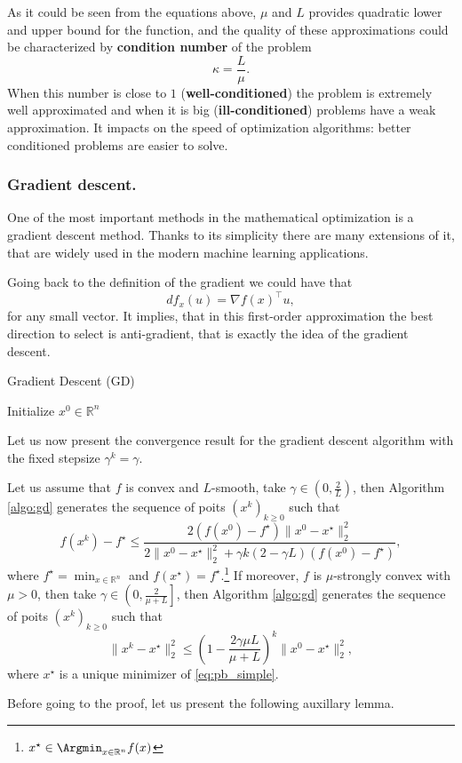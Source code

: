 As it could be seen from the equations above, $\mu$ and $L$ provides quadratic lower and upper bound for the function, and the quality of these approximations could be characterized by {\textbf{condition number}} of the problem
$$
\kappa =  \frac{L}{\mu}.
$$
When this number is close to $1$ ({\textbf{well-conditioned}}) the problem is extremely well approximated and when it is big ({\textbf{ill-conditioned}}) problems have a weak approximation. It impacts on the speed of optimization algorithms: better conditioned problems are easier to solve.





\subsubsection{Gradient descent.} One of the most important methods in the mathematical optimization is a gradient descent method. Thanks to its simplicity there are many extensions of it, that are widely used in the modern machine learning applications. 

Going back to the definition of the gradient we could have that
$$
df_x(u) = \nabla f(x)^\top u,
$$
for any small vector. It implies, that in this first-order approximation the best direction to select is anti-gradient, that is exactly the idea of the gradient descent.

\begin{algorithm}
    \caption{Gradient Descent (GD)}
    \label{algo:gd}
    \begin{algorithmic}
        \STATE Initialize $x^0\in\mathbb{R}^n$
        \ENDFOR
    \end{algorithmic}
\end{algorithm}

Let us now present the convergence result for the gradient descent algorithm with the fixed stepsize $\gamma^k = \gamma$.
\begin{theorem}\label{th:gd}
Let us assume that $f$ is convex and $L$-smooth, take $\gamma\in\left(0,\frac{2}{L}\right)$, then Algorithm \ref{algo:gd} generates the sequence of poits $(x^k)_{k\geq0}$ such that 
\begin{equation}
    f(x^k) - f^\star \leq \frac{2(f(x^0)-f^\star)\|x^0-x^\star\|_2^2}{2\|x^0-x^\star\|_2^2 + \gamma k(2-\gamma L)(f(x^0) - f^\star)},
\end{equation}
where $f^\star = \min_{x\in\mathbb{R}^n}$ and $f(x^\star) = f^\star$.\footnote{$x^\star\in\Argmin_{x\in\mathbb{R}^n}f(x)$}
If moreover, $f$ is $\mu$-strongly convex with $\mu>0$, then take $\gamma\in\left(0, \frac{2}{\mu + L}\right]$, then Algorithm \ref{algo:gd} generates the sequence of poits $(x^k)_{k\geq0}$ such that 
\begin{equation}
\|x^k-x^\star\|_2^2\leq\left(1-\frac{2\gamma\mu L}{\mu + L}\right)^k\|x^0-x^\star\|_2^2,
\end{equation}
where $x^\star$ is a unique minimizer of \eqref{eq:pb_simple}.
\end{theorem}
Before going to the proof, let us present the following auxillary lemma.

